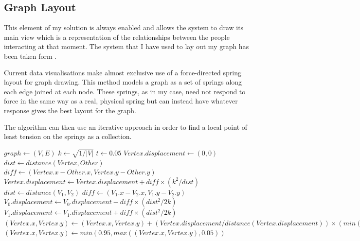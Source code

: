 \documentclass[12pt,a4paper]{article}
\begin{document}
\subsection{Graph Layout}

This element of my solution is always enabled and allows the system to draw its main view which is a representation of the relationships between the people interacting at that moment. The system that I have used to lay out my graph has been taken form \cite{fruchterman1991graph}.

Current data visualisations make almost exclusive use of a force-directed spring layout for graph drawing. This method models a graph as a set of springs along each edge joined at each node. These springs, as in my case, need not respond to force in the same way as a real, physical spring but can instead have whatever response gives the best layout for the graph.

The algorithm can then use an iterative approach in order to find a local point of least tension on the springs as a collection. 

\begin{algorithm}[htb]
\caption{Graph sprint-directed layout algorithm}
\label{alg:graph}
\begin{algorithmic}
\State $graph \gets (V, E)$ 
\State $k \gets \sqrt{1/|V|}$
\State $t \gets 0.05$
	\State $Vertex.displacement \gets (0,0)$
		\State $dist \gets distance(Vertex, Other)$ 
		\State $diff \gets (Vertex.x-Other.x, Vertex.y-Other.y)$
		\State $Vertex.displacement \gets Vertex.displacement + diff \times (k^{2}/dist)$
	\EndFor
\EndFor
{} 
	\State $dist \gets distance(V_{1}, V_{2})$
	\State $diff \gets (V_{1}.x-V_{2}.x, V_{1}.y-V_{2}.y)$
	\State $V_{0}.displacement \gets V_{0}.displacement - diff \times (dist^{2}/2k)$
	\State $V_{1}.displacement \gets V_{1}.displacement + diff \times (dist^{2}/2k)$
\EndFor
{}
	\State $(Vertex.x, Vertex.y) \gets (Vertex.x, Vertex.y) + (Vertex.displacement/distance(Vertex.displacement)) \times (min(distance(Vertex.displacement), t))$ 
	\State $(Vertex.x, Vertex.y) \gets min(0.95, max((Vertex.x, Vertex.y), 0.05))$ 
\EndFor
\end{algorithmic}
\end{algorithm}
\end{document}
